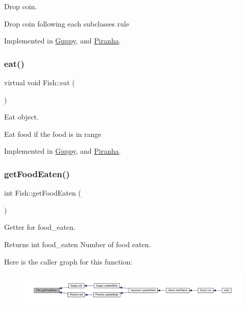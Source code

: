 Drop coin. 

Drop coin following each subclasses rule 

Implemented in \mbox{\hyperlink{class_guppy_a356d1f45f52684bba3e6e9e7774e59b8}{Guppy}}, and \mbox{\hyperlink{class_piranha_aee107987f36631002f04c5283564382b}{Piranha}}.

\mbox{\label{class_fish_af209980bd39b8de9b4bb38b7ad4edd04}} 
\subsubsection{\texorpdfstring{eat()}{eat()}}
{\footnotesize\ttfamily virtual void Fish\+::eat (\begin{DoxyParamCaption}{ }\end{DoxyParamCaption})\hspace{0.3cm}{\ttfamily [pure virtual]}}



Eat object. 

Eat food if the food is in range 

Implemented in \mbox{\hyperlink{class_guppy_afe934262a0988e4ad041f4ed3a1a7e02}{Guppy}}, and \mbox{\hyperlink{class_piranha_ac48c0256edd56c427b3d82f6e0d4df82}{Piranha}}.

\mbox{\label{class_fish_a5ff6258ba2d031b4cc815e8318bea135}} 
\subsubsection{\texorpdfstring{get\+Food\+Eaten()}{getFoodEaten()}}
{\footnotesize\ttfamily int Fish\+::get\+Food\+Eaten (\begin{DoxyParamCaption}{ }\end{DoxyParamCaption})}



Getter for food\+\_\+eaten. 

\begin{DoxyReturn}{Returns}
int food\+\_\+eaten Number of food eaten. 
\end{DoxyReturn}
Here is the caller graph for this function\+:\nopagebreak
\begin{figure}[H]
\begin{center}
\leavevmode
\includegraphics[width=350pt]{class_fish_a5ff6258ba2d031b4cc815e8318bea135_icgraph}
\end{center}
\end{figure}
\mbox{\label{class_fish_aa4f43ec5e63aff8a1db32d530a91652d}} 

